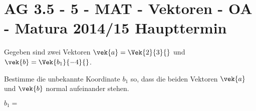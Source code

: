 \section{AG 3.5 - 5 - MAT - Vektoren - OA - Matura 2014/15 Haupttermin}

\begin{beispiel}[AG 3.5]{1} %
Gegeben sind zwei Vektoren $\vek{a}=\Vek{2}{3}{}$ und $\vek{b}=\Vek{b_1}{-4}{}$. \leer

Bestimme die unbekannte Koordinate $b_1$ so, dass die beiden Vektoren $\vek{a}$ und $\vek{b}$ normal aufeinander stehen. \leer

$b_1=$ 

\end{beispiel}
